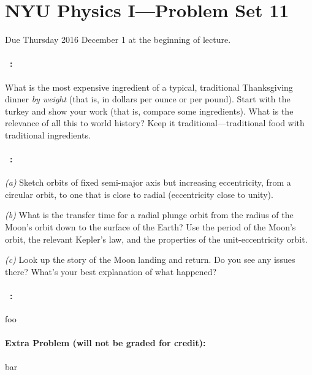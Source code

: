 \documentclass[12pt]{article}
\begin{document}
\section*{NYU Physics I---Problem Set 11}

Due Thursday 2016 December 1 at the beginning of lecture.

\paragraph{\problemname~\theproblem:}%
What is the most expensive ingredient of a typical, traditional
Thanksgiving dinner \emph{by weight} (that is, in dollars per ounce or
per pound).  Start with the turkey and show your work (that is,
compare some ingredients). What is the relevance of all this to world
history? Keep it traditional---traditional food with traditional
ingredients.

\paragraph{\problemname~\theproblem:}%
\textsl{(a)} Sketch orbits of fixed semi-major axis but increasing
eccentricity, from a circular orbit, to one that is close to radial
(eccentricity close to unity).

\textsl{(b)} What is the transfer time for a radial plunge orbit
from the radius of the Moon's orbit down to the surface of the Earth?
Use the period of the Moon's orbit, the relevant  Kepler's law, and
the properties of the unit-eccentricity orbit.

\textsl{(c)} Look up the story of the Moon landing and return.
Do you see any issues there? What's your best explanation of what
happened?

\paragraph{\problemname~\theproblem:}%
foo

\paragraph{Extra Problem (will not be graded for credit):}%
bar
\end{document}
